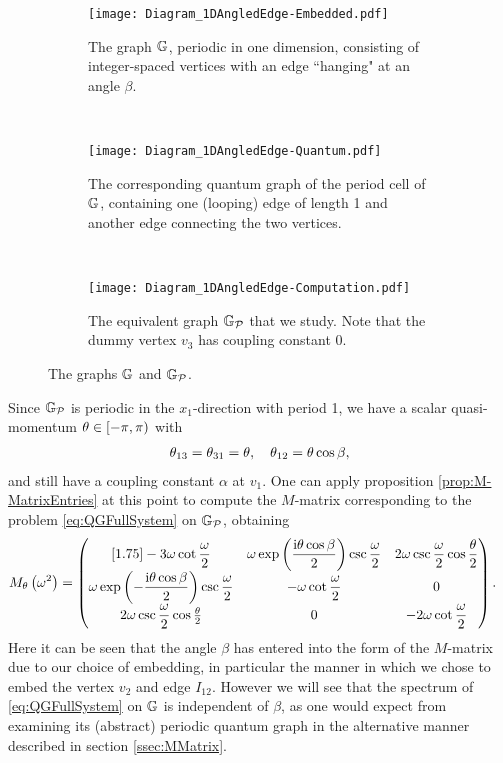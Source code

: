 \begin{figure}[t]
	\centering
	\begin{subfigure}[t]{0.3\textwidth}
		\centering
		\texttt{[image: Diagram\_1DAngledEdge-Embedded.pdf]}
		\caption{\label{fig:Diagram_1DAngledEdge-Embedded} The graph $\mathbb{G}$, periodic in one dimension, consisting of integer-spaced vertices with an edge ``hanging" at an angle $\beta$.}
	\end{subfigure}
	~
	\begin{subfigure}[t]{0.3\textwidth}
		\centering
		\texttt{[image: Diagram\_1DAngledEdge-Quantum.pdf]}
		\caption{\label{fig:Diagram_1DAngledEdge-Quantum} The corresponding quantum graph of the period cell of $\mathbb{G}$, containing one (looping) edge of length 1 and another edge connecting the two vertices.}
	\end{subfigure}
	~
	\begin{subfigure}[t]{0.3\textwidth}
		\centering
		\texttt{[image: Diagram\_1DAngledEdge-Computation.pdf]}	
		\caption{\label{fig:Diagram_1DAngledEdge-Computation} The equivalent graph $\mathbb{G}_{\mathcal{P}}$ that we study. Note that the dummy vertex $v_3$ has coupling constant 0.}
	\end{subfigure}
	\caption{\label{fig:Diagram_1DAngledEdgeExample} The graphs $\mathbb{G}$ and $\mathbb{G}_{\mathcal{P}}$.}
\end{figure}

Since $\mathbb{G}_{\mathcal{P}}$ is periodic in the $x_1$-direction with period 1, we have a scalar quasi-momentum $\theta\in\left[-\pi,\pi\right)$ with
\begin{align*}
	\theta_{13} = \theta_{31} = \theta, \quad \theta_{12} = \theta\cos\beta,
\end{align*}
and still have a coupling constant $\alpha$ at $v_1$. 
One can apply proposition \ref{prop:M-MatrixEntries} at this point to compute the $M$-matrix corresponding to the problem \eqref{eq:QGFullSystem} on $\mathbb{G}_{\mathcal{P}}$, obtaining
\begin{align} \label{eq:EmbeddedGraphMMatrix}
	M_\theta\left( \omega^2 \right) &=
	\begin{pmatrix}[1.75]
		-3\omega\cot\dfrac{\omega}{2} & \omega \exp\left( \dfrac{\mathrm{i}\theta\cos\beta}{2} \right)\csc\dfrac{\omega}{2} & 2\omega\csc\dfrac{\omega}{2}\cos\dfrac{\theta}{2} \\
		\omega \exp\left( -\dfrac{\mathrm{i}\theta\cos\beta}{2} \right)\csc\dfrac{\omega}{2} & -\omega\cot\dfrac{\omega}{2} & 0 \\
		2\omega\csc\dfrac{\omega}{2}\cos\frac{\theta}{2} & 0 & -2\omega\cot\dfrac{\omega}{2}
	\end{pmatrix}.
\end{align}
Here it can be seen that the angle $\beta$ has entered into the form of the $M$-matrix due to our choice of embedding, in particular the manner in which we chose to embed the vertex $v_2$ and edge $I_{12}$.
However we will see that the spectrum of \eqref{eq:QGFullSystem} on $\mathbb{G}$ is independent of $\beta$, as one would expect from examining its (abstract) periodic quantum graph in the alternative manner described in section \ref{ssec:MMatrix}.

